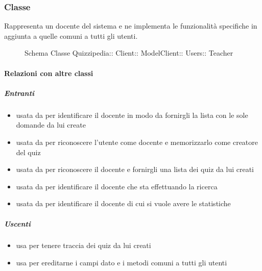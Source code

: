\subsubsection{Classe }
Rappresenta un docente del sistema e ne implementa le funzionalità specifiche in aggiunta a quelle comuni a tutti gli utenti.
\begin{figure}[H]
\centering
\noindent{}
\caption[Schema Classe Teacher]{Schema Classe Quizzipedia:: Client:: ModelClient:: Users:: Teacher}
\end{figure}
\paragraph{Relazioni con altre classi}
\subparagraph{Entranti}
\begin{itemize}
\item usata da  per identificare il docente in modo da fornirgli la lista con le sole domande da lui create
\item usata da  per riconoscere l'utente come docente e memorizzarlo come creatore del quiz
\item usata da  per riconoscere il docente e fornirgli una lista dei quiz da lui creati
\item usata da  per identificare il docente che sta effettuando la ricerca
\item usata da  per identificare il docente di cui si vuole avere le statistiche
\end{itemize}
\subparagraph{Uscenti}
\begin{itemize}
\item usa  per tenere traccia dei quiz da lui creati
\item usa  per ereditarne i campi dato e i metodi comuni a tutti gli utenti
\end{itemize}
